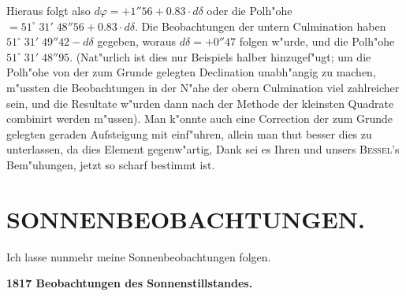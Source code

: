 \documentclass[12pt,a4paper]{article}
\begin{document}
Hieraus folgt also $d\varphi = +1''56 + 0.83 \cdot d\delta$ oder die Polh"ohe $= 51^{\circ}\;31'\;48''56 + 0.83 \cdot d\delta$.
Die Beobachtungen der untern Culmination haben $51^{\circ}\;31'\;49''42 - d\delta$ gegeben, woraus
$d\delta = +0''47$ folgen w"urde, und die Polh"ohe $51^{\circ}\;31'\;48''95$. (Nat"urlich ist dies nur Beispiels
halber hinzugef"ugt; um die Polh"ohe von der zum Grunde gelegten Declination unabh"angig zu machen,
m"ussten die Beobachtungen in der N"ahe der obern Culmination viel zahlreicher sein, und die Resultate
w"urden dann nach der Methode der kleinsten Quadrate combinirt werden m"ussen). Man k"onnte auch
eine Correction der zum Grunde gelegten geraden Aufsteigung mit einf"uhren, allein man thut besser dies
zu unterlassen, da dies Element gegenw"artig, Dank sei es Ihren und unsers \textsc{Bessel}'s Bem"uhungen,
jetzt so scharf bestimmt ist.

\newpage

\section*{SONNENBEOBACHTUNGEN.}

Ich lasse nunmehr meine Sonnenbeobachtungen folgen.

\begin{center}
\textbf{1817 Beobachtungen des Sonnenstillstandes.}
\end{center}
\end{document}
